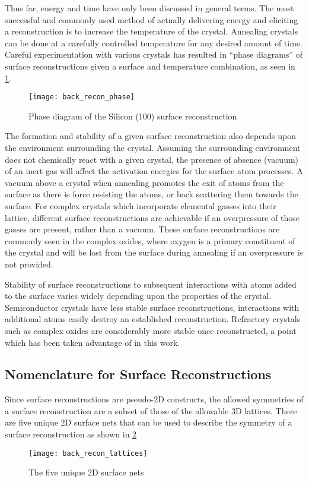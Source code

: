 Thus far, energy and time have only been discussed in general terms. The most successful and commonly used method of actually delivering energy and eliciting a reconstruction is to increase the temperature of the crystal. Annealing crystals can be done at a carefully controlled temperature for any desired amount of time. Careful experimentation with various crystals has resulted in ``phase diagrams'' of surface reconstructions given a surface and temperature combination, as seen in \cref{fig:back_recon_phase}.
\begin{figure}
    \centering
    \texttt{[image: back\_recon\_phase]}
    \caption[Silicon surface reconstruction phase diagram]{\label{fig:back_recon_phase}Phase diagram of the Silicon (100) surface reconstruction\cite{Pehlke1991}}
\end{figure}

The formation and stability of a given surface reconstruction also depends upon the environment surrounding the crystal. Assuming the surrounding environment does not chemically react with a given crystal, the presence of absence (vacuum) of an inert gas will affect the activation energies for the surface atom processes. A vacuum above a crystal when annealing promotes the exit of atoms from the surface as there is force resisting the atoms, or back scattering them towards the surface. For complex crystals which incorporate elemental gasses into their lattice, different surface reconstructions are achievable if an overpressure of those gasses are present, rather than a vacuum. These surface reconstructions are commonly seen in the complex oxides, where oxygen is a primary constituent of the crystal and will be lost from the surface during annealing if an overpressure is not provided.

Stability of surface reconstructions to subsequent interactions with atoms added to the surface varies widely depending upon the properties of the crystal. Semiconductor crystals have less stable surface reconstructions, interactions with additional atoms easily destroy an established reconstruction. Refractory crystals such as complex oxides are considerably more stable once reconstructed, a point which has been taken advantage of in this work.

\subsection{Nomenclature for Surface Reconstructions}
Since surface reconstructions are pseudo-2D constructs, the allowed symmetries of a surface reconstruction are a subset of those of the allowable 3D lattices. There are five unique 2D surface nets that can be used to describe the symmetry of a surface reconstruction as shown in \cref{fig:back_recon_lattices}
\begin{figure}
    \centering
    \texttt{[image: back\_recon\_lattices]}
    \caption[2D Surface Nets]{\label{fig:back_recon_lattices}The five unique 2D surface nets\cite{ohring2001materials}}
\end{figure}

